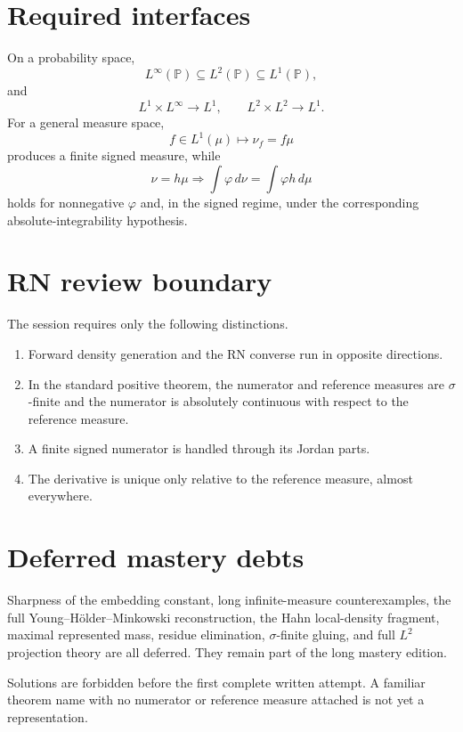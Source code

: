 \section*{Required interfaces}

On a probability space,
\[
L^\infty(\mathbb P)
\subseteq
L^2(\mathbb P)
\subseteq
L^1(\mathbb P),
\]
and
\[
L^1\times L^\infty\longrightarrow L^1,
\qquad
L^2\times L^2\longrightarrow L^1.
\]
For a general measure space,
\[
f\in L^1(\mu)
\longmapsto
\nu_f=f\mu
\]
produces a finite signed measure, while
\[
\nu=h\mu
\Longrightarrow
\int \varphi\,d\nu=\int \varphi h\,d\mu
\]
holds for nonnegative $\varphi$ and, in the signed regime, under the corresponding absolute-integrability hypothesis.

\section*{RN review boundary}

The session requires only the following distinctions.
\begin{enumerate}
  \item Forward density generation and the RN converse run in opposite directions.
  \item In the standard positive theorem, the numerator and reference measures are $\sigma$-finite and the numerator is absolutely continuous with respect to the reference measure.
  \item A finite signed numerator is handled through its Jordan parts.
  \item The derivative is unique only relative to the reference measure, almost everywhere.
\end{enumerate}

\section*{Deferred mastery debts}

Sharpness of the embedding constant, long infinite-measure counterexamples, the full Young--Hölder--Minkowski reconstruction, the Hahn local-density fragment, maximal represented mass, residue elimination, $\sigma$-finite gluing, and full $L^2$ projection theory are all deferred. They remain part of the long mastery edition.

Solutions are forbidden before the first complete written attempt. A familiar theorem name with no numerator or reference measure attached is not yet a representation.
